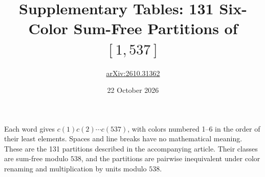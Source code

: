 \documentclass[11pt,a4paper]{article}
\title{Supplementary Tables: 131 Six-Color Sum-Free Partitions of $[1,537]$}
\author{\small\href{https://arxiv.org/abs/2610.31362}{arXiv:2610.31362}}
\date{22 October 2026}
\begin{document}
\maketitle
Each word gives $c(1)c(2)\cdots c(537)$, with colors numbered 1--6 in the order
of their least elements. Spaces and line breaks have no mathematical meaning.
These are the 131 partitions described in the accompanying article.
Their classes are sum-free modulo $538$, and the partitions are pairwise
inequivalent under color renaming and multiplication by units modulo $538$.
\par\medskip

\end{document}
